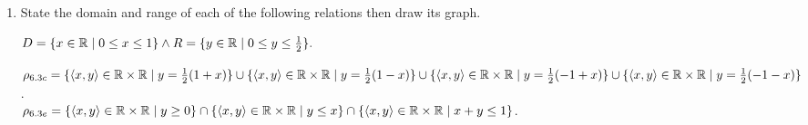 \documentclass[11pt]{book}
\begin{document}
\renewcommand{\labelenumi}{1.6.\arabic{enumi}}
\begin{enumerate}

{By definition of ordered triple, $\tuple{x,y,z} = \tuple{\tuple{x,y},z} = \tuple{\tuple{u,v},w}$. Then $z=w$ and $\tuple{x,y} = \tuple{u,v}$. Then from theorem 6.1, we have $x=u$ and $y=v$.}
{$\rho = \set{1,2} \times \set{2,3,4} = \set{\tuple{1,2}, \tuple{1,3}, \tuple{1,4}, \tuple{2,2}, \tuple{2,3}, \tuple{2,4}}\\D_{\rho} = \set{1,2} \land R_{\rho} = \set{2,3,4}$}
\item State the domain and range of each of the following relations then draw its graph.
	\begin{enumerate}
	{$D = \{x\in\mathbb{R} \mid 0 \leq x \leq 1\} \land R = \{y\in\mathbb{R} \mid 0 \leq y \leq \frac{1}{2}\}.$}
	\end{enumerate}
	
{$\rho_{6.3c} = \{\langle x,y\rangle\in\mathbb{R}\times\mathbb{R} \mid y = \frac{1}{2}(1+x)\} \cup \{\langle x,y\rangle\in\mathbb{R}\times\mathbb{R} \mid y = \frac{1}{2}(1-x)\} \cup \{\langle x,y\rangle\in\mathbb{R}\times\mathbb{R} \mid y = \frac{1}{2}(-1+x)\} \cup \{\langle x,y\rangle\in\mathbb{R}\times\mathbb{R} \mid y = \frac{1}{2}(-1-x)\}$.\\ $\rho_{6.3e} = \{\langle x,y\rangle\in\mathbb{R}\times\mathbb{R} \mid y \geq 0\} \cap \{\langle x,y\rangle\in\mathbb{R}\times\mathbb{R} \mid y \leq x\} \cap \{\langle x,y\rangle\in\mathbb{R}\times\mathbb{R} \mid x + y \leq 1\}$.}


\end{enumerate}
\end{document}
